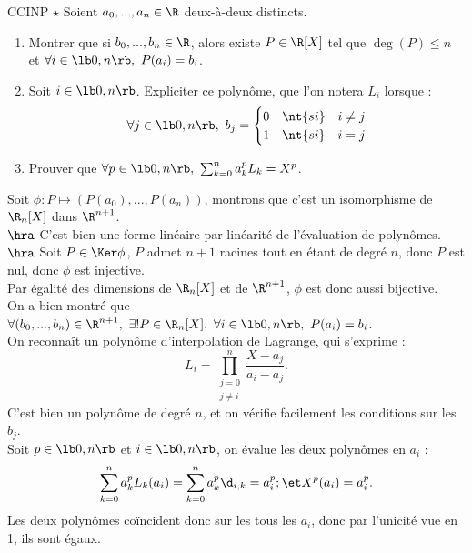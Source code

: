 \documentclass[11pt]{article}
\begin{document}
\begin{exercice}{CCINP $\star$}{}
    Soient $a_0,...,a_n\in\R$ deux-à-deux distincts.
    \begin{enumerate}
        \item Montrer que si $b_0,...,b_n\in\R$, alors existe $P\in\R[X]$ tel que $\deg(P)\leq n$ et $\forall i\in\lb0,n\rb, ~ P(a_i)=b_i$.
        \item Soit $i\in\lb0,n\rb$. Expliciter ce polynôme, que l'on notera $L_i$ lorsque :
        \begin{equation*}
            \forall j \in \lb0,n\rb, ~ b_j = \begin{cases}0 &\nt{si} \quad i\neq j \\ 1 &\nt{si} \quad i = j\end{cases}
        \end{equation*}
        \item Prouver que $\forall p \in \lb0,n\rb, ~ \sum_{k=0}^na_k^pL_k=X^p$.
    \end{enumerate}
    \tcblower
     Soit $\phi:P\mapsto (P(a_0),...,P(a_n))$, montrons que c'est un isomorphisme de $\R_n[X]$ dans $\R^{n+1}$.\\
    $\hra$ C'est bien une forme linéaire par linéarité de l'évaluation de polynômes.\\
    $\hra$ Soit $P\in\Ker\phi$, $P$ admet $n+1$ racines tout en étant de degré $n$, donc $P$ est nul, donc $\phi$ est injective.\\
    Par égalité des dimensions de $\R_n[X]$ et de $\R^{n+1}$, $\phi$ est donc aussi bijective.\\
    On a bien montré que $\forall (b_0,...,b_n)\in\R^{n+1}, ~ \exists!P\in\R_n[X], ~ \forall i \in \lb0,n\rb, ~ P(a_i)=b_i$.\\
     On reconnaît un polynôme d'interpolation de Lagrange, qui s'exprime :
    \begin{equation*}
        L_i = \prod_{\substack{j = 0\\j\neq i}}^n \frac{X-a_j}{a_i-a_j}.
    \end{equation*}
    C'est bien un polynôme de degré $n$, et on vérifie facilement les conditions sur les $b_j$.\\
     Soit $p\in\lb0,n\rb$ et $i\in\lb0,n\rb$, on évalue les deux polynômes en $a_i$ :
    \begin{equation*}
        \sum_{k=0}^na_k^pL_k(a_i) = \sum_{k=0}^na_k^p\d_{i,k} = a_i^p; \et X^p(a_i) = a_i^p.
    \end{equation*}
    Les deux polynômes coïncident donc sur les tous les $a_i$, donc par l'unicité vue en 1, ils sont égaux.
\end{exercice}
\end{document}
